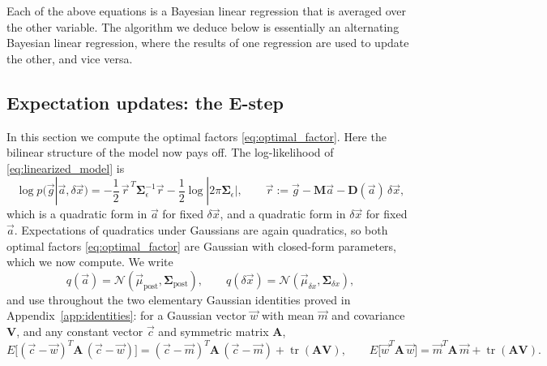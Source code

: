 \documentclass{article}
\begin{document}
Each of the above equations is a Bayesian linear regression that is averaged over the other variable. The algorithm we deduce below is essentially an alternating Bayesian linear regression, where the results of one regression are used to update the other, and vice versa. 



\subsection{Expectation updates: the E-step} \label{sec:estep}

In this section we compute the optimal factors \eqref{eq:optimal_factor}. Here the bilinear structure of the model now pays off. The log-likelihood of \eqref{eq:linearized_model} is
\begin{equation}
    \log p(\vec g|\vec a, \delta\vec x) = -\frac{1}{2}\,\vec r^{\,T}\mathbf{\Sigma}_\epsilon^{-1}\vec r - \frac{1}{2}\log|2\pi\mathbf{\Sigma}_\epsilon|, \qquad \vec r := \vec g - \mathbf M\vec a - \mathbf D(\vec a)\,\delta\vec x, \label{eq:loglik}
\end{equation}
which is a quadratic form in $\vec a$ for fixed $\delta\vec x$, and a quadratic form in $\delta\vec x$ for fixed $\vec a$. Expectations of quadratics under Gaussians are again quadratics, so both optimal factors \eqref{eq:optimal_factor} are Gaussian with closed-form parameters, which we now compute. We write
\begin{equation}
    q(\vec a) = \mathcal N(\vec\mu_{\text{post}}, \mathbf{\Sigma}_{\text{post}}), \qquad q(\delta\vec x) = \mathcal N(\vec\mu_{\delta x}, \mathbf{\Sigma}_{\delta x}),
\end{equation}
and use throughout the two elementary Gaussian identities proved in Appendix~\ref{app:identities}: for a Gaussian vector $\vec w$ with mean $\vec m$ and covariance $\mathbf V$, and any constant vector $\vec c$ and symmetric matrix $\mathbf A$,
\begin{equation}
    E\big[(\vec c-\vec w)^T \mathbf A\, (\vec c-\vec w)\big] = (\vec c-\vec m)^T \mathbf A\, (\vec c-\vec m) + \operatorname{tr}(\mathbf A \mathbf V), \qquad
    E\big[\vec w^T \mathbf A\, \vec w\big] = \vec m^T \mathbf A\, \vec m + \operatorname{tr}(\mathbf A \mathbf V). \label{eq:quad_expectations}
\end{equation}
\end{document}
